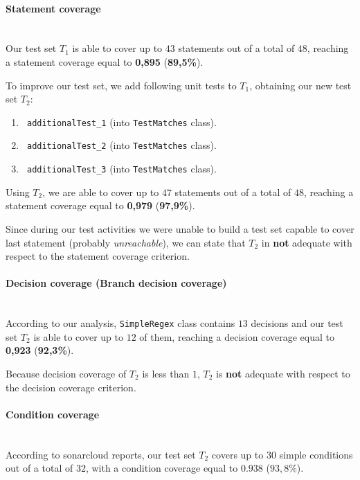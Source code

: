 \documentclass[sigconf]{acmart}
\begin{document}
\paragraph{Statement coverage}
\hfill\\

Our test set $T_1$ is able to cover up to $43$ statements out of a total of $48$, reaching a statement coverage equal to \textbf{0,895} (\textbf{89,5\%}).

To improve our test set, we add following unit tests to $T_1$, obtaining our new test set $T_2$:
\begin{enumerate}
\item\texttt{ additionalTest\_1} (into \texttt{TestMatches} class).
\item\texttt{ additionalTest\_2} (into \texttt{TestMatches} class).
\item\texttt{ additionalTest\_3} (into \texttt{TestMatches} class).
\end{enumerate}

Using $T_2$, we are able to cover up to $47$ statements out of a total of $48$, reaching a statement coverage equal to \textbf{0,979} (\textbf{97,9\%}).

Since during our test activities we were unable to build a test set capable to cover last statement (probably \textit{unreachable}), we can state that $T_2$ in \textbf{not} adequate with respect to the statement coverage criterion.

\paragraph{Decision coverage (Branch decision coverage)}
\hfill\\

According to our analysis, \texttt{SimpleRegex} class contains $13$ decisions and our test set $T_2$ is able to cover up to $12$ of them, reaching a decision coverage equal to \textbf{0,923} (\textbf{92,3\%}). 

Because decision coverage of $T_2$ is less than $1$, $T_2$ is \textbf{not} adequate with respect to the decision coverage criterion.

\paragraph{Condition coverage}
\hfill\\

According to sonarcloud reports, our test set $T_2$ covers up to $30$ simple conditions out of a total of $32$, with a condition coverage equal to $0.938$ ($93,8\%$).
\end{document}
